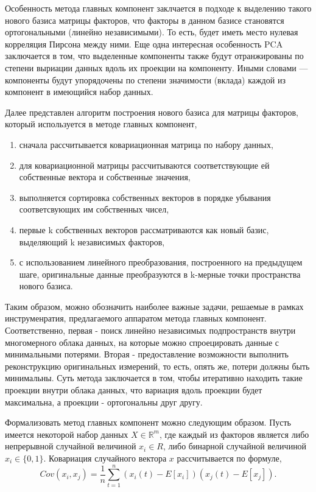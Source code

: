\documentclass[runningheads]{llncs}
\begin{document}
Особенность метода главных компонент заклчается в подходе к выделению такого нового базиса матрицы факторов, что факторы в данном базисе становятся ортогональными (линейно независимыми). То есть, будет иметь место нулевая корреляция Пирсона между ними. Еще одна интересная особенность PCA заключается в том, что выделенные компоненты также будут отранжированы по степени выриации данных вдоль их проекции на компоненту. Иными словами — компоненты будут упорядочены по степени значимости (вклада) каждой из компонент в имеющийся набор данных.

Далее представлен алгоритм построения нового базиса для матрицы факторов, который используется в методе главных компонент,
\begin{enumerate}
  \item сначала рассчитывается ковариационная матрица по набору данных,
  \item для ковариационной матрицы рассчитываются соответствующие ей собственные вектора и собственные значения,
  \item выполняется сортировка собственных векторов в порядке убывания соответсвующих им собственных чисел,
  \item первые k собственных векторов рассматриваются как новый базис, выделяющий k независимых факторов,
  \item с использованием линейного преобразования, построенного на предыдущем шаге, оригинальные данные преобразуются в k-мерные точки пространства нового базиса.
\end{enumerate}

Таким образом, можно обозначить наиболее важные задачи, решаемые в рамках инструменратия, предлагаемого аппаратом метода главных компонент. Соответственно, первая - поиск линейно независимых подпространств внутри многомерного облака данных, на которые можно спроецировать данные с минимальными потерями. Вторая - предоставление возможности выполнить реконструкцию оригинальных измерений, то есть, опять же, потери должны быть минимальны. Суть метода заключается в том, чтобы итеративно находить такие проекции внутри облака данных, что вариация вдоль проекции будет максимальна, а проекции - ортогональны друг другу. \par

Формализовать метод главных компонент можно следующим образом. Пусть имеется некоторой набор данных ${X \in \mathbb{R}^m}$, где каждый из факторов является либо непрерывной случайной величиной $x_i \in R$, либо бинарной случайной величиной $x_i \in \{0, 1\}$. Ковариация случайного вектора $x$ рассчитывается по формуле, $$Cov(x_i, x_j) = \frac{1}{n} \sum_{t=1}^n (x_i(t) - E[x_i])(x_j(t) - E[x_j]).$$ \par 
\end{document}
